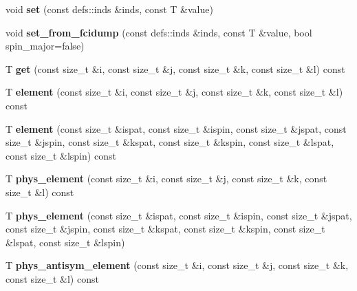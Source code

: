 \begin{DoxyCompactItemize}
\item 
void {\bfseries set} (const defs\+::inds \&inds, const T \&value)\hypertarget{classIntegrals__2e_aae87cd8a02d77a16fe03ddb5dfb83870}{}\label{classIntegrals__2e_aae87cd8a02d77a16fe03ddb5dfb83870}

\item 
void {\bfseries set\+\_\+from\+\_\+fcidump} (const defs\+::inds \&inds, const T \&value, bool spin\+\_\+major=false)\hypertarget{classIntegrals__2e_adb1a52bac2013c5873ef7c27136506a1}{}\label{classIntegrals__2e_adb1a52bac2013c5873ef7c27136506a1}

\item 
T {\bfseries get} (const size\+\_\+t \&i, const size\+\_\+t \&j, const size\+\_\+t \&k, const size\+\_\+t \&l) const \hypertarget{classIntegrals__2e_ae5b99d50f6287691a7277a6739e34870}{}\label{classIntegrals__2e_ae5b99d50f6287691a7277a6739e34870}

\item 
T {\bfseries element} (const size\+\_\+t \&i, const size\+\_\+t \&j, const size\+\_\+t \&k, const size\+\_\+t \&l) const \hypertarget{classIntegrals__2e_a5da037fab4adbcae7f8b0688db61015c}{}\label{classIntegrals__2e_a5da037fab4adbcae7f8b0688db61015c}

\item 
T {\bfseries element} (const size\+\_\+t \&ispat, const size\+\_\+t \&ispin, const size\+\_\+t \&jspat, const size\+\_\+t \&jspin, const size\+\_\+t \&kspat, const size\+\_\+t \&kspin, const size\+\_\+t \&lspat, const size\+\_\+t \&lspin) const \hypertarget{classIntegrals__2e_a252e644b5f183101942933b4510f5bfd}{}\label{classIntegrals__2e_a252e644b5f183101942933b4510f5bfd}

\item 
T {\bfseries phys\+\_\+element} (const size\+\_\+t \&i, const size\+\_\+t \&j, const size\+\_\+t \&k, const size\+\_\+t \&l) const \hypertarget{classIntegrals__2e_a64921e348860e7888cc1a09895c47c92}{}\label{classIntegrals__2e_a64921e348860e7888cc1a09895c47c92}

\item 
T {\bfseries phys\+\_\+element} (const size\+\_\+t \&ispat, const size\+\_\+t \&ispin, const size\+\_\+t \&jspat, const size\+\_\+t \&jspin, const size\+\_\+t \&kspat, const size\+\_\+t \&kspin, const size\+\_\+t \&lspat, const size\+\_\+t \&lspin)\hypertarget{classIntegrals__2e_a682cbd2ff57e84cf32b5b2af9fb7cf45}{}\label{classIntegrals__2e_a682cbd2ff57e84cf32b5b2af9fb7cf45}

\item 
T {\bfseries phys\+\_\+antisym\+\_\+element} (const size\+\_\+t \&i, const size\+\_\+t \&j, const size\+\_\+t \&k, const size\+\_\+t \&l) const \hypertarget{classIntegrals__2e_aa7fea1ef7267ff36439bf1cc7580eb0a}{}\label{classIntegrals__2e_aa7fea1ef7267ff36439bf1cc7580eb0a}


\end{DoxyCompactItemize}
